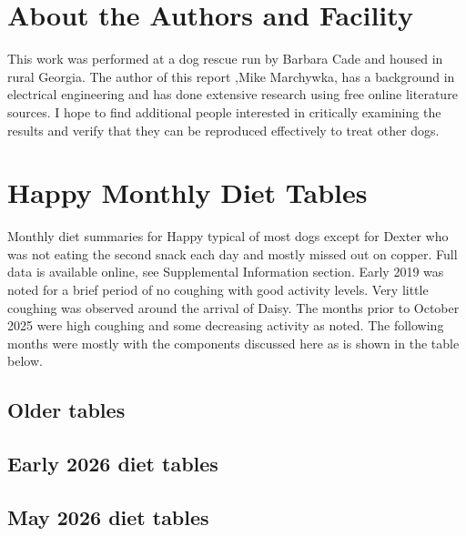 \begin{mdpicomment}
\section{About the Authors and Facility}
This work was performed at a dog rescue run by Barbara Cade and
housed in rural Georgia.  The author of this report 
,Mike Marchywka,
has a background in electrical engineering and 
has done extensive research using free online literature sources.  
I hope to find additional people interested in critically 
examining the results and verify that they can be reproduced
effectively to treat other dogs.

\section{Happy Monthly Diet Tables}
\label{appendix:diettab}
Monthly diet summaries for Happy typical of most
dogs except for Dexter who was not eating the second
snack each day and mostly missed out on copper.
Full data is available online, see Supplemental Information section.
Early 2019 was noted for a brief period of no coughing
with good activity levels. Very little coughing was
observed around the arrival of Daisy. The months prior
to October 2025 were high coughing and some decreasing
activity as noted. The following months were mostly
with the components discussed here as is shown in the table
below. 
\subsection{ Older tables}
{
}

\subsection{ Early 2026 diet tables}
{  } 

\subsection{ May 2026 diet tables}
{  } 



\end{mdpicomment}
